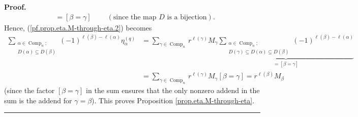 \documentclass[numbers=enddot,12pt,final,onecolumn,notitlepage]{scrartcl}%
\theoremstyle{definition}
\newenvironment{proof}[1][Proof]{\noindent\textbf{#1.} }{\ \rule{0.5em}{0.5em}}
\let\sumnonlimits\sum
\renewcommand{\sum}{\sumnonlimits\limits}
\newenvironment{vershort}{}{}
\begin{document}
\begin{vershort}
\begin{proof}
\begin{align*}
&  =\left[  \beta=\gamma\right]  \ \ \ \ \ \ \ \ \ \ \left(  \text{since the
map }D\text{ is a bijection}\right)  .
\end{align*}
Hence, (\ref{pf.prop.eta.M-through-eta.2}) becomes%
\begin{align*}
\sum_{\substack{\alpha\in\operatorname*{Comp}\nolimits_{n};\\D\left(
\alpha\right)  \subseteq D\left(  \beta\right)  }}\left(  -1\right)
^{\ell\left(  \beta\right)  -\ell\left(  \alpha\right)  }\eta_{\alpha
}^{\left(  q\right)  }  &  =\sum_{\gamma\in\operatorname*{Comp}\nolimits_{n}%
}r^{\ell\left(  \gamma\right)  }M_{\gamma}\underbrace{\sum_{\substack{\alpha
\in\operatorname*{Comp}\nolimits_{n};\\D\left(  \gamma\right)  \subseteq
D\left(  \alpha\right)  \subseteq D\left(  \beta\right)  }}\left(  -1\right)
^{\ell\left(  \beta\right)  -\ell\left(  \alpha\right)  }}_{=\left[
\beta=\gamma\right]  }\\
&  =\sum_{\gamma\in\operatorname*{Comp}\nolimits_{n}}r^{\ell\left(
\gamma\right)  }M_{\gamma}\left[  \beta=\gamma\right]  =r^{\ell\left(
\beta\right)  }M_{\beta}%
\end{align*}
(since the factor $\left[  \beta=\gamma\right]  $ in the sum ensures that the
only nonzero addend in the sum is the addend for $\gamma=\beta$). This proves
Proposition \ref{prop.eta.M-through-eta}.
\end{proof}
\end{vershort}
\end{document}
